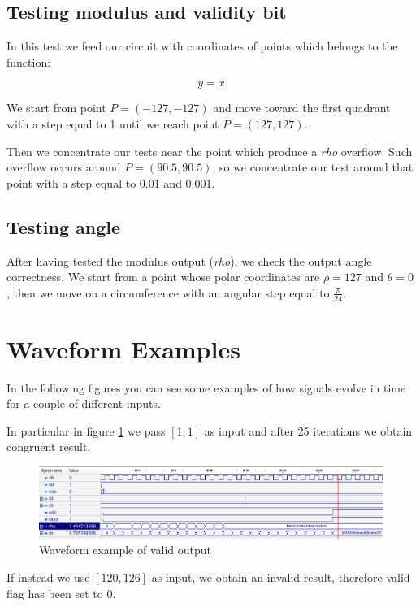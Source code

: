 \documentclass[12pt,a4paper]{report}
\begin{document}
\subsection{Testing modulus and validity bit}
In this test we feed our circuit with coordinates of points which belongs to the function:

\begin{equation}
	y = x
\end{equation}

We start from point $P = \left(-127, -127\right)$ and move toward the first quadrant with a step equal to 1 until we reach point $P=(127,127)$.

Then we concentrate our tests near the point which produce a \emph{rho} overflow. Such overflow occurs around $P=(90.5,90.5)$, so we concentrate our test around that point with a step equal to 0.01 and 0.001.

\subsection{Testing angle}
After having tested the modulus output (\emph{rho}), we check the output angle correctness. We start from a point whose polar coordinates are $\rho=127$ and $\theta=0$, then we move on a circumference with an angular step equal to $\frac{\pi}{24}$.

\section{Waveform Examples}
In the following figures you can see some examples of how signals evolve in time for a couple of different inputs.

In particular in figure \ref{fig:bisector} we pass $[1,1]$ as input and after 25 iterations we obtain congruent result.

\begin{figure}[!h]
\centering
\includegraphics[width=\textwidth]{img/test-bisettrice.png}
\caption{Waveform example of valid output\label{fig:bisector}}
\end{figure}

If instead we use $[120,126]$ as input, we obtain an invalid result, therefore valid flag has been set to 0.
\end{document}
